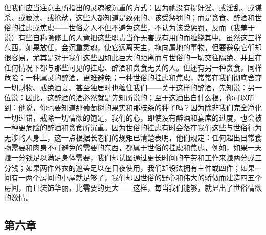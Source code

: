 但我们应当注意主所指出的灵魂被沉重的方式：因为祂没有提奸淫、或淫乱、或谋杀、或亵渎、或抢劫，这些人都知道是致死的、该受惩罚的；而是贪食、醉酒和世俗的挂虑或焦虑——世俗之人不但不避免这些，不认为该受惩罚，反而（我羞于说）有些自称隐修士的人竟把这些职责当作无害或有用的而缠绕其中。虽然这三样东西，如果放任，会沉重灵魂，使它远离天主，拖向属地的事物，但要避免它们却很容易，尤其是对于我们这些因如此巨大的距离而与世俗的一切交往隔绝、并且在任何情况下都与那些可见的挂虑、醉酒和贪食无关的人。但还有另一种贪食，同样危险；一种属灵的醉酒，更难避免；一种世俗的挂虑和焦虑，常常在我们彻底舍弃一切财物、戒绝酒宴、甚至独居时也缠住我们——关于这样的醉酒，先知说：另一位说：因此，这醉酒的酒必然就是先知所说的；至于这酒出自什么根，你可以听到：他说，你也要知道那葡萄树的果实和那枝条的种子吗？因为除非我们完全净化一切过错，戒除一切情欲的饱足，我们的心，即使没有醉酒和宴席的过度，也会被一种更危险的醉酒和贪食所沉重。因为世俗的挂虑有时会落在我们这些与世俗行为无涉的人身上，这一点根据长老们的规矩已清楚表明，他们规定：任何超出日常食物需要和肉身不可避免的需要的东西，都属于世俗的挂虑和焦虑，例如，如果一天赚一分钱足以满足身体需要，我们却试图通过更长时间的辛劳和工作来赚两分或三分钱；如果两件外衣的遮盖足以在日夜使用，我们却设法拥有三件或四件；如果一间有一两个房间的小屋就足够了，我们却因世俗的野心和伟大的骄傲而建造四五个房间，而且装饰华丽，比需要的更大——这样，每当我们能够，就显出了世俗情欲的激情。\par


\subsection{第六章}

\par


